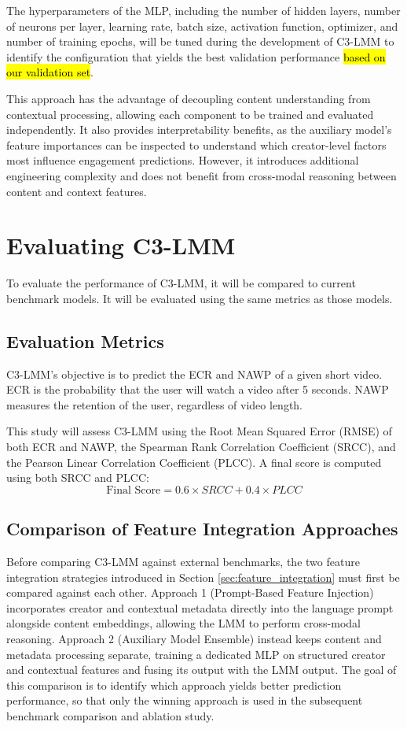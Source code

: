 The hyperparameters of the MLP, including the number of hidden layers, number of neurons per layer, learning rate, batch size, activation function, optimizer, and number of training epochs, will be tuned during the development of C3-LMM to identify the configuration that yields the best validation performance \hl{based on our validation set}.

This approach has the advantage of decoupling content understanding from contextual processing, allowing each component to be trained and evaluated independently. It also provides interpretability benefits, as the auxiliary model's feature importances can be inspected to understand which creator-level factors most influence engagement predictions. However, it introduces additional engineering complexity and does not benefit from cross-modal reasoning between content and context features.

\section{Evaluating C3-LMM}

To evaluate the performance of C3-LMM, it will be compared to current benchmark models. It will be evaluated using the same metrics as those models.

\subsection{Evaluation Metrics}

C3-LMM's objective is to predict the ECR and NAWP of a given short video. ECR is the probability that the user will watch a video after 5 seconds. NAWP measures the retention of the user, regardless of video length.

This study will assess C3-LMM using the Root Mean Squared Error (RMSE) of both ECR and NAWP, the Spearman Rank Correlation Coefficient (SRCC), and the Pearson Linear Correlation Coefficient (PLCC). A final score is computed using both SRCC and PLCC: 
\begin{equation}
    \text{Final Score} = 0.6\times SRCC + 0.4\times PLCC
\end{equation}

\subsection{Comparison of Feature Integration Approaches}

Before comparing C3-LMM against external benchmarks, the two feature integration strategies introduced in Section \ref{sec:feature_integration} must first be compared against each other. Approach 1 (Prompt-Based Feature Injection) incorporates creator and contextual metadata directly into the language prompt alongside content embeddings, allowing the LMM to perform cross-modal reasoning. Approach 2 (Auxiliary Model Ensemble) instead keeps content and metadata processing separate, training a dedicated MLP on structured creator and contextual features and fusing its output with the LMM output. The goal of this comparison is to identify which approach yields better prediction performance, so that only the winning approach is used in the subsequent benchmark comparison and ablation study.

